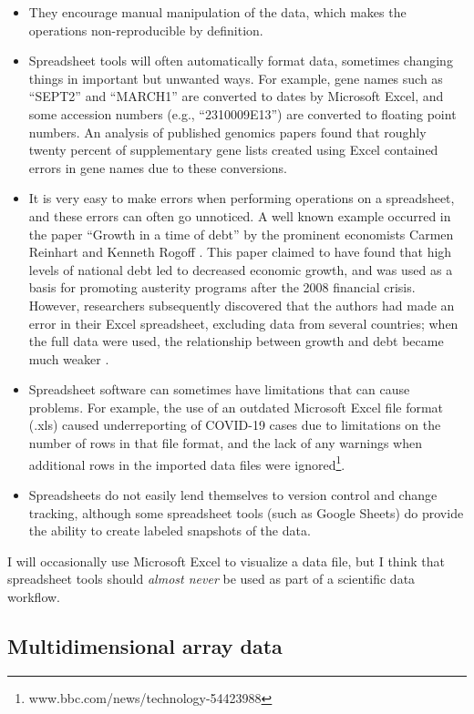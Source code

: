 \begin{itemize}
\item They encourage manual manipulation of the data, which makes the operations non-reproducible by definition.
\item Spreadsheet tools will often automatically format data, sometimes changing things in important but unwanted ways.  For example, gene names such as ``SEPT2'' and ``MARCH1'' are converted to dates by Microsoft Excel, and some accession numbers (e.g., ``2310009E13'') are converted to floating point numbers.  An analysis of published genomics papers \citep{Ziemann:2016aa} found that roughly twenty percent of supplementary gene lists created using Excel contained errors in gene names due to these conversions.
\item It is very easy to make errors when performing operations on a spreadsheet, and these errors can often go unnoticed.  A well known example occurred in the paper  ``Growth in a time of debt'' by the prominent economists Carmen Reinhart and Kenneth Rogoff \citep{Reinhart:2010aa}. This paper claimed to have found that high levels of national debt led to decreased economic growth, and was used as a basis for promoting austerity programs after the 2008 financial crisis.  However, researchers subsequently discovered that the authors had made an error in their Excel spreadsheet, excluding data from several countries; when the full data were used, the relationship between growth and debt became much weaker \citep{Herndon:2013aa}.
\item Spreadsheet software can sometimes have limitations that can cause problems.  For example, the use of an outdated Microsoft Excel file format (.xls) caused underreporting of COVID-19 cases due to limitations on the number of rows in that file format, and the lack of any warnings when additional rows in the imported data files were ignored\footnote{www.bbc.com/news/technology-54423988}.
\item Spreadsheets do not easily lend themselves to version control and change tracking, although some spreadsheet tools (such as Google Sheets) do provide the ability to create labeled snapshots of the data.
\end{itemize}

I will occasionally use Microsoft Excel to visualize a data file, but I think that spreadsheet tools should \textit{almost never} be used as part of a scientific data workflow.

\subsection{Multidimensional array data}

